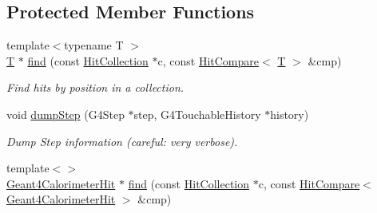 \subsection*{Protected Member Functions}
\begin{DoxyCompactItemize}
\item 
{\footnotesize template$<$typename T $>$ }\\\hyperlink{class_t}{T} $\ast$ \hyperlink{class_d_d4hep_1_1_simulation_1_1_geant4_sensitive_detector_a04d024952896041576da2d022d80cc08}{find} (const \hyperlink{class_d_d4hep_1_1_geometry_1_1_hit_collection}{HitCollection} $\ast$c, const \hyperlink{class_d_d4hep_1_1_simulation_1_1_hit_compare}{HitCompare}$<$ \hyperlink{class_t}{T} $>$ \&cmp)
\begin{DoxyCompactList}\small\item\em Find hits by position in a collection. \item\end{DoxyCompactList}\item 
void \hyperlink{class_d_d4hep_1_1_simulation_1_1_geant4_sensitive_detector_aa5dfd46956ecfddd3815e12be4436430}{dumpStep} (G4Step $\ast$step, G4TouchableHistory $\ast$history)
\begin{DoxyCompactList}\small\item\em Dump Step information (careful: very verbose). \item\end{DoxyCompactList}\item 
{\footnotesize template$<$$>$ }\\\hyperlink{class_d_d4hep_1_1_simulation_1_1_geant4_calorimeter_hit}{Geant4CalorimeterHit} $\ast$ \hyperlink{class_d_d4hep_1_1_simulation_1_1_geant4_sensitive_detector_aa3245e74ef546a9aec6cb2c34d2adedb}{find} (const \hyperlink{class_d_d4hep_1_1_geometry_1_1_hit_collection}{HitCollection} $\ast$c, const \hyperlink{class_d_d4hep_1_1_simulation_1_1_hit_compare}{HitCompare}$<$ \hyperlink{class_d_d4hep_1_1_simulation_1_1_geant4_calorimeter_hit}{Geant4CalorimeterHit} $>$ \&cmp)
\end{DoxyCompactItemize}
